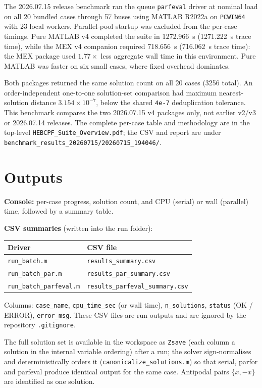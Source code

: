 \documentclass[11pt,a4paper]{article}
\newcommand{\code}[1]{\texttt{#1}}
\begin{document}
The 2026.07.15 release benchmark ran the queue \code{parfeval} driver at nominal load on
all 20 bundled cases through 57 buses using MATLAB R2022a on \code{PCWIN64} with 23 local
workers. Parallel-pool startup was excluded from the per-case timings. Pure MATLAB v4
completed the suite in 1272.966~s (1271.222~s trace time), while the MEX v4 companion
required 718.656~s (716.062~s trace time): the MEX package used $1.77\times$ less aggregate
wall time in this environment. Pure MATLAB was faster on six small cases, where fixed
overhead dominates.

Both packages returned the same solution count on all 20 cases (3256 total). An
order-independent one-to-one solution-set comparison had maximum nearest-solution distance
$3.154\times10^{-7}$, below the shared \code{4e-7} deduplication tolerance. This benchmark
compares the two 2026.07.15 v4 packages only, not earlier v2/v3 or 2026.07.14 releases.
The complete per-case table and methodology are in the top-level
\code{HEBCPF_Suite_Overview.pdf}; the CSV and report are under
\code{benchmark_results_20260715/20260715_194046/}.

\section{Outputs}

\textbf{Console:} per-case progress, solution count, and CPU (serial) or wall (parallel)
time, followed by a summary table.

\textbf{CSV summaries} (written into the run folder):
\begin{center}\small
\begin{tabular}{@{}ll@{}}
\toprule
Driver & CSV file\\
\midrule
\code{run_batch.m}          & \code{results_summary.csv}\\
\code{run_batch_par.m}      & \code{results_par_summary.csv}\\
\code{run_batch_parfeval.m} & \code{results_parfeval_summary.csv}\\
\bottomrule
\end{tabular}
\end{center}
Columns: \code{case_name}, \code{cpu_time_sec} (or wall time), \code{n_solutions},
\code{status} (OK / ERROR), \code{error_msg}.
These CSV files are run outputs and are ignored by the repository \code{.gitignore}.

The full solution set is available in the workspace as \code{Zsave} (each column a
solution in the internal variable ordering) after a run; the solver sign-normalises and
deterministically orders it (\code{canonicalize_solutions.m}) so that serial, parfor and
parfeval produce identical output for the same case. Antipodal pairs $\{x,-x\}$ are
identified as one solution.
\end{document}
